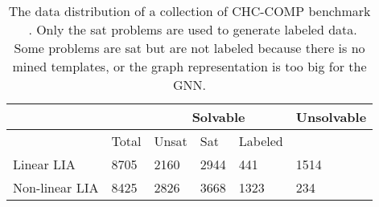 
\begin{table*}[tb]
\caption{The data distribution of a collection of CHC-COMP benchmark ~\cite{chcBenchmark}. Only the sat problems are used to generate labeled data. Some problems are sat but are not labeled because there is no mined templates, or the graph representation is too big for the GNN.}
\label{benchmark-table}
\begin{tabular}{l|l|l|l|l|l}
\hline
     & &  \multicolumn{3}{c|}{Solvable} & Unsolvable \\
\hline
    & Total & Unsat & Sat & Labeled  &  \\
\hline
    Linear LIA      & 8705  & 2160 & 2944 & 441    & 1514  \\
\hline
    Non-linear LIA  & 8425  & 2826 & 3668 & 1323  & 234   \\

\hline
\end{tabular}
\end{table*}